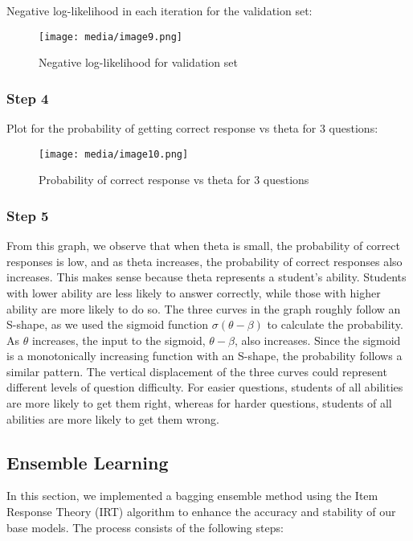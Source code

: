 \documentclass{article}
\begin{document}
Negative log-likelihood in each iteration for the validation set:

\begin{figure}[htbp]
\centering
\texttt{[image: media/image9.png]}
\caption{Negative log-likelihood for validation set}
\end{figure}

\subsubsection{Step 4}
Plot for the probability of getting correct response vs theta for 3 questions:

\begin{figure}[htbp]
\centering
\texttt{[image: media/image10.png]}
\caption{Probability of correct response vs theta for 3 questions}
\end{figure}

\subsubsection{Step 5}
From this graph, we observe that when theta is small, the probability of correct responses is low, and as theta increases, the probability of correct responses also increases. This makes sense because theta represents a student's ability. Students with lower ability are less likely to answer correctly, while those with higher ability are more likely to do so. The three curves in the graph roughly follow an S-shape, as we used the sigmoid function $\sigma(\theta - \beta)$ to calculate the probability. As $\theta$ increases, the input to the sigmoid, $\theta - \beta$, also increases. Since the sigmoid is a monotonically increasing function with an S-shape, the probability follows a similar pattern. The vertical displacement of the three curves could represent different levels of question difficulty. For easier questions, students of all abilities are more likely to get them right, whereas for harder questions, students of all abilities are more likely to get them wrong.

\subsection{Ensemble Learning}

In this section, we implemented a bagging ensemble method using the Item Response Theory (IRT) algorithm to enhance the accuracy and stability of our base models. The process consists of the following steps:
\end{document}
